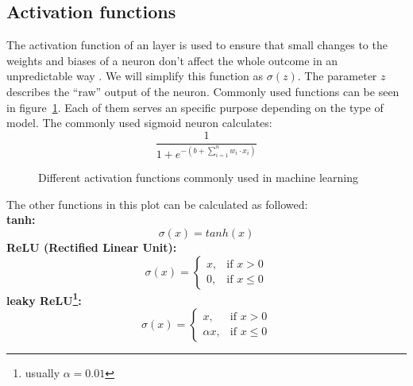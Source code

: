 \documentclass{article}
\begin{document}
\subsection{Activation functions}
\label{ref:activation_functions}
The activation function of an layer is used to ensure that small changes to the weights and biases of a neuron don't affect the whole outcome in an unpredictable way \autocite[Chapter \textit{Using neural nets to recognize handwritten digits - Sigmoid Neurons}]{Nielsen:NNDP}. We will simplify this function as $\sigma(z)$. The parameter $z$ describes the ``raw'' output of the neuron. Commonly used functions can be seen in figure~\ref{fig:activation_functions}. 
Each of them serves an specific purpose depending on the type of model. The commonly used sigmoid neuron calculates: $$\frac{1}{1+e^{-\left(b+\sum_{i=1}^n w_i\cdot x_i\right)}}$$
\begin{figure}[H]
\centering
{}
\caption{Different activation functions commonly used in machine learning}
\label{fig:activation_functions}
\end{figure}
The other functions in this plot can be calculated as followed:\\
\textbf{tanh:} $$\sigma(x) = tanh(x)$$
\textbf{ReLU (Rectified Linear Unit):} $$\sigma(x) = 
\begin{cases}
    x, & \text{if } x > 0\\
    0, & \text{if } x \leq 0
\end{cases}$$
\textbf{leaky ReLU\footnote{usually $\alpha=0.01$}:} $$\sigma(x) = 
\begin{cases}
    x, & \text{if } x > 0\\
    \alpha x, & \text{if } x \leq 0
\end{cases}$$
\end{document}
